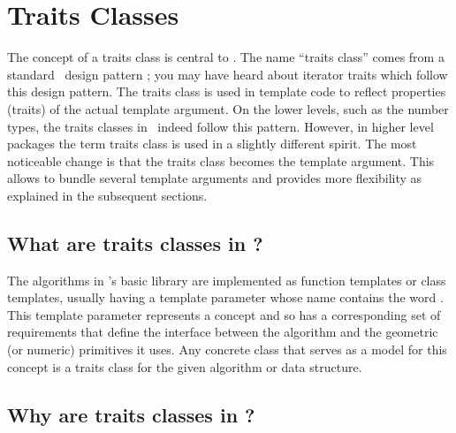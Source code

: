 
\chapter{Traits Classes\label{chap:traits_classes}}

The concept of a traits class is central to \cgal. The name ``traits
class'' comes from a standard \CC\ design pattern
\cite{cgal:m-tnutt-95}; you may have heard about iterator traits which
follow this design pattern. 
The traits class is used in template code to reflect properties (traits)
of the actual template argument.
On the lower levels, such as the number types, 
the traits classes in \cgal\ indeed follow this pattern.  
However, in higher level packages the term traits class is used in a slightly 
different spirit. The most noticeable change is that the traits class becomes 
the template argument. This allows to bundle several template 
arguments and provides more flexibility as explained in the subsequent
sections. 

\section{What are traits classes in \cgal?\label{sec:what_is_a_traits_class}}

The algorithms in \cgal's basic library are implemented as function templates
or class templates, usually having a template parameter whose name contains
the word .  This template parameter 
represents a concept and so has a corresponding set of requirements that
define the interface between the algorithm and the geometric (or numeric) 
primitives it uses.  Any concrete class that serves as a model for this 
concept is a traits class for the given algorithm or data structure.

\section{Why are traits classes in \cgal?\label{sec:why_traits_classes}}

